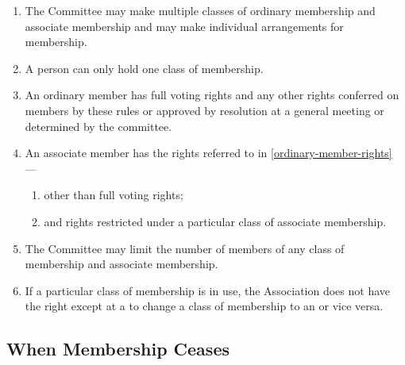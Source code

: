 \documentclass[../constitution.tex]{subfiles}
\begin{document}
\begin{enumerate}
\item The Committee may make multiple classes of ordinary membership and associate membership and may make individual arrangements for membership. 
\item A person  can only hold one class of membership. 
\item An ordinary member has full voting rights and any other rights conferred on members by these rules or approved by resolution at a general meeting or determined by the committee. \label{ordinary-member-rights}
\item An associate member has the rights referred to in  \ref{ordinary-member-rights} --- \label{associate-member-rights}
  \begin{enumerate}
  \item other than full voting rights;
  \item and rights restricted under a particular class of associate membership.
  \end{enumerate}
\item The Committee may limit the number of members of any class of membership and associate membership.
\item \label{swap-ordinary-associate-membership} If a particular class of membership is in use, the Association does not have the right except at a  to change a class of  membership to an  or vice versa.
\end{enumerate}


\subsection{When Membership Ceases} \label{when-membership-ceases}
\end{document}
